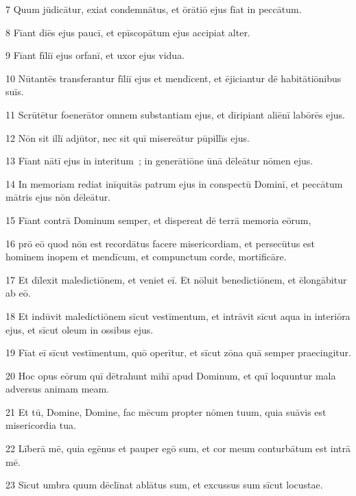 \psalmVerse
  {\phantom{00}7}
  {Quum jūdicātur, exiat condemnātus, et ōrātiō ejus fīat in peccātum.}


\psalmVerse
  {\phantom{00}8}
  {Fīant diēs ejus paucī, et epīscopātum ejus accipiat alter.}


\psalmVerse
  {\phantom{00}9}
  {Fīant fīliī ejus orfanī, et uxor ejus vidua.}


\psalmVerse
  {\phantom{0}10}
  {Nūtantēs transferantur fīliī ejus et mendīcent, et ējiciantur dē habitātiōnibus suīs.}


\psalmVerse
  {\phantom{0}11}
  {Scrūtētur foenerātor omnem substantiam ejus, et dīripiant aliēnī labōrēs ejus.}


\psalmVerse
  {\phantom{0}12}
  {Nōn sit illī adjūtor, nec sit quī misereātur pūpillīs ejus.}


\psalmVerse
  {\phantom{0}13}
  {Fīant nātī ejus in interitum~; in generātiōne ūnā dēleātur nōmen ejus.}


\psalmVerse
  {\phantom{0}14}
  {In memoriam rediat inīquitās patrum ejus in conspectū Dominī, et peccātum mātris ejus nōn dēleātur.}


\psalmVerse
  {\phantom{0}15}
  {Fīant contrā Dominum semper, et dispereat dē terrā memoria eōrum,}


\psalmVerse
  {\phantom{0}16}
  {prō eō quod nōn est recordātus facere misericordiam, et persecūtus est hominem inopem et mendīcum, et compunctum corde, mortificāre.}


\psalmVerse
  {\phantom{0}17}
  {Et dīlexit maledictiōnem, et veniet eī. Et nōluit benedictiōnem, et ēlongābitur ab eō.}


\psalmVerse
  {\phantom{0}18}
  {Et indūvit maledictiōnem sīcut vestīmentum, et intrāvit sīcut aqua in interiōra ejus, et sīcut oleum in ossibus ejus.}


\psalmVerse
  {\phantom{0}19}
  {Fīat eī sīcut vestīmentum, quō operītur, et sīcut zōna quā semper praecingitur.}


\psalmVerse
  {\phantom{0}20}
  {Hoc opus eōrum quī dētrahunt mihī apud Dominum, et quī loquuntur mala adversus animam meam.}


\psalmVerse
  {\phantom{0}21}
  {Et tū, Domine, Domine, fac mēcum propter nōmen tuum, quia suāvis est misericordia tua.}


\psalmVerse
  {\phantom{0}22}
  {Līberā mē, quia egēnus et pauper egō sum, et cor meum conturbātum est intrā mē.}


\psalmVerse
  {\phantom{0}23}
  {Sīcut umbra quum dēclīnat ablātus sum, et excussus sum sīcut locustae.}



